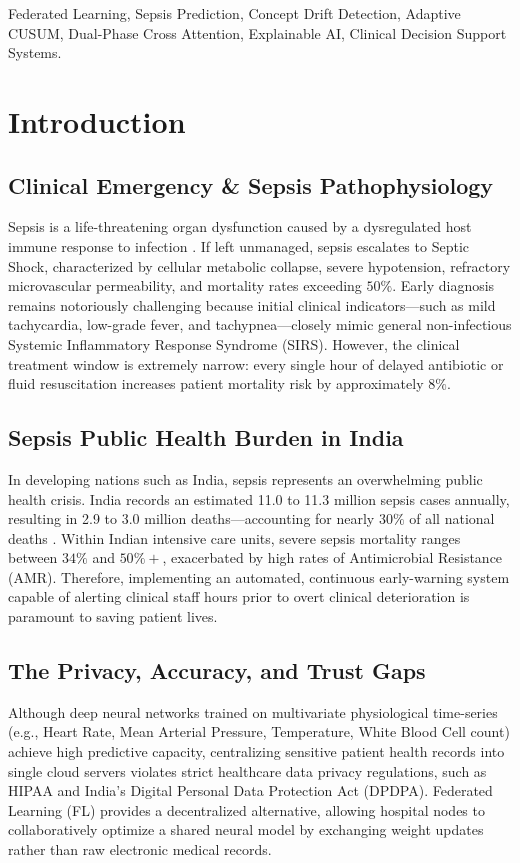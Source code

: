 \documentclass[conference]{IEEEtran}
\begin{document}
\begin{IEEEkeywords}
Federated Learning, Sepsis Prediction, Concept Drift Detection, Adaptive CUSUM, Dual-Phase Cross Attention, Explainable AI, Clinical Decision Support Systems.
\end{IEEEkeywords}

\section{Introduction}
\subsection{Clinical Emergency \& Sepsis Pathophysiology}
Sepsis is a life-threatening organ dysfunction caused by a dysregulated host immune response to infection \cite{dusing2025sepsis}. If left unmanaged, sepsis escalates to Septic Shock, characterized by cellular metabolic collapse, severe hypotension, refractory microvascular permeability, and mortality rates exceeding $50\%$. Early diagnosis remains notoriously challenging because initial clinical indicators—such as mild tachycardia, low-grade fever, and tachypnea—closely mimic general non-infectious Systemic Inflammatory Response Syndrome (SIRS). However, the clinical treatment window is extremely narrow: every single hour of delayed antibiotic or fluid resuscitation increases patient mortality risk by approximately $8\%$.

\subsection{Sepsis Public Health Burden in India}
In developing nations such as India, sepsis represents an overwhelming public health crisis. India records an estimated 11.0 to 11.3 million sepsis cases annually, resulting in 2.9 to 3.0 million deaths—accounting for nearly $30\%$ of all national deaths \cite{kalakoti2025fedxai}. Within Indian intensive care units, severe sepsis mortality ranges between $34\%$ and $50\%+$, exacerbated by high rates of Antimicrobial Resistance (AMR). Therefore, implementing an automated, continuous early-warning system capable of alerting clinical staff hours prior to overt clinical deterioration is paramount to saving patient lives.

\subsection{The Privacy, Accuracy, and Trust Gaps}
Although deep neural networks trained on multivariate physiological time-series (e.g., Heart Rate, Mean Arterial Pressure, Temperature, White Blood Cell count) achieve high predictive capacity, centralizing sensitive patient health records into single cloud servers violates strict healthcare data privacy regulations, such as HIPAA and India's Digital Personal Data Protection Act (DPDPA). Federated Learning (FL) provides a decentralized alternative, allowing hospital nodes to collaboratively optimize a shared neural model by exchanging weight updates rather than raw electronic medical records.
\end{document}
